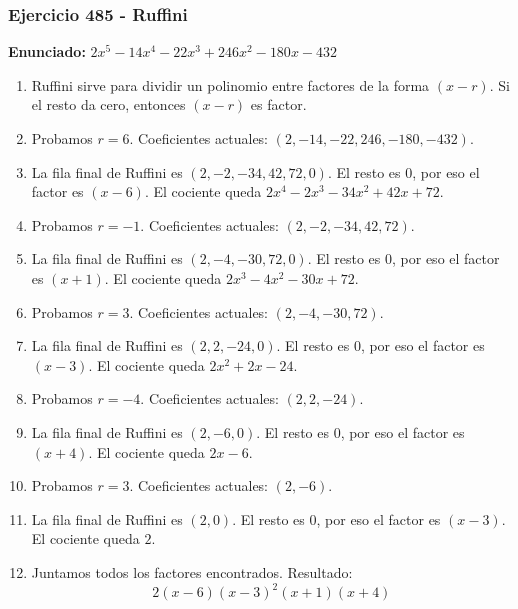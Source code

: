 \documentclass[11pt,a4paper]{article}
\begin{document}
\subsubsection*{Ejercicio 485 - Ruffini}
\textbf{Enunciado:} $ 2 x^{5} - 14 x^{4} - 22 x^{3} + 246 x^{2} - 180 x - 432 $\par
\begin{enumerate}[leftmargin=2em]
\item Ruffini sirve para dividir un polinomio entre factores de la forma \((x-r)\). Si el resto da cero, entonces \((x-r)\) es factor.
\item Probamos \(r=6\). Coeficientes actuales: \((2, -14, -22, 246, -180, -432)\).
\item La fila final de Ruffini es \((2, -2, -34, 42, 72, 0)\). El resto es \(0\), por eso el factor es \((x-6)\). El cociente queda \(2 x^{4} - 2 x^{3} - 34 x^{2} + 42 x + 72\).
\item Probamos \(r=-1\). Coeficientes actuales: \((2, -2, -34, 42, 72)\).
\item La fila final de Ruffini es \((2, -4, -30, 72, 0)\). El resto es \(0\), por eso el factor es \((x+1)\). El cociente queda \(2 x^{3} - 4 x^{2} - 30 x + 72\).
\item Probamos \(r=3\). Coeficientes actuales: \((2, -4, -30, 72)\).
\item La fila final de Ruffini es \((2, 2, -24, 0)\). El resto es \(0\), por eso el factor es \((x-3)\). El cociente queda \(2 x^{2} + 2 x - 24\).
\item Probamos \(r=-4\). Coeficientes actuales: \((2, 2, -24)\).
\item La fila final de Ruffini es \((2, -6, 0)\). El resto es \(0\), por eso el factor es \((x+4)\). El cociente queda \(2 x - 6\).
\item Probamos \(r=3\). Coeficientes actuales: \((2, -6)\).
\item La fila final de Ruffini es \((2, 0)\). El resto es \(0\), por eso el factor es \((x-3)\). El cociente queda \(2\).
\item Juntamos todos los factores encontrados. Resultado: \[\boxed{2 \left(x - 6\right) \left(x - 3\right)^{2} \left(x + 1\right) \left(x + 4\right)}\]
\end{enumerate}

\vspace{0.2cm}
\end{document}
